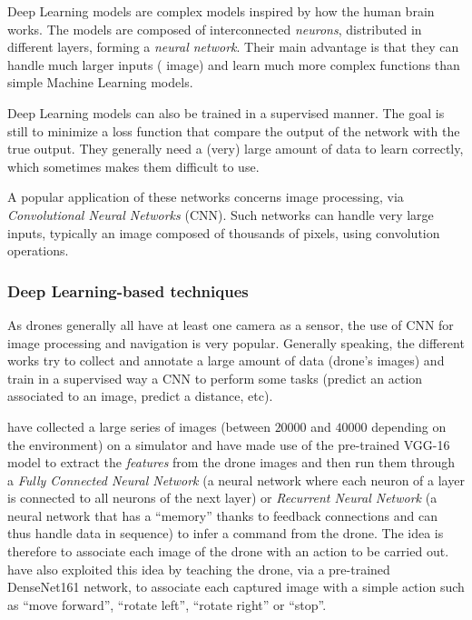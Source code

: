 Deep Learning models are complex models inspired by how the human brain works. The models are composed of interconnected \emph{neurons}, distributed in different layers, forming a \emph{neural network}. Their main advantage is that they can handle much larger inputs (\eg{} image) and learn much more complex functions than simple Machine Learning models.

Deep Learning models can also be trained in a supervised manner. The goal is still to minimize a loss function that compare the output of the network with the true output. They generally need a (very) large amount of data to learn correctly, which sometimes makes them difficult to use.

A popular application of these networks concerns image processing, via \emph{Convolutional Neural Networks} (CNN). Such networks can handle very large inputs, typically an image composed of thousands of pixels, using convolution operations.

\subsubsection{Deep Learning-based techniques}

As drones generally all have at least one camera as a sensor, the use of CNN for image processing and navigation is very popular. Generally speaking, the different works try to collect and annotate a large amount of data (drone's images) and train in a supervised way a CNN to perform some tasks (predict an action associated to an image, predict a distance, etc).

\textcite{amer2021deep} have collected a large series of images (between $\num{20000}$ and $\num{40000}$ depending on the environment) on a simulator and have made use of the pre-trained VGG-16 model \cite{simonyan2014very} to extract the \emph{features} from the drone images and then run them through a \emph{Fully Connected Neural Network} (a neural network where each neuron of a layer is connected to all neurons of the next layer) or \emph{Recurrent Neural Network} (a neural network that has a \enquote{memory} thanks to feedback connections and can thus handle data in sequence) to infer a command from the drone. The idea is therefore to associate each image of the drone with an action to be carried out. \textcite{padhy2018deep} have also exploited this idea by teaching the drone, via a pre-trained DenseNet161 \cite{huang2017densely} network, to associate each captured image with a simple action such as \enquote{move forward}, \enquote{rotate left}, \enquote{rotate right} or \enquote{stop}.

